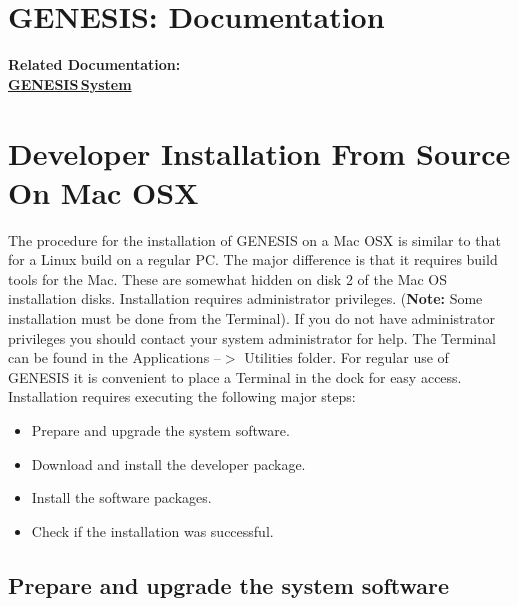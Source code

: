 \documentclass[12pt]{article}
\begin{document}
\section*{GENESIS: Documentation}

{\bf Related Documentation:} \\
\href{../genesis-system/genesis-system.tex}{\bf GENESIS\,System}


\section*{Developer Installation From Source On Mac OSX}

The procedure for the installation of GENESIS on a Mac OSX is similar to that for a Linux build on a regular PC. The major difference is that it requires build tools for the Mac. These are somewhat hidden on disk 2 of the Mac OS installation disks. Installation requires administrator privileges. ({\bf Note:} Some installation must be done from the Terminal). If you do not have administrator privileges you should contact your system administrator for help. The Terminal can be found in the Applications --$>$ Utilities folder. For regular use of GENESIS it is convenient to place a Terminal in the dock for easy access.
Installation requires executing the following major steps:
\begin{itemize}
   \item[] Prepare and upgrade the system software.
   \item[] Download and install the developer package.
   \item[] Install the software packages.
   \item[] Check if the installation was successful. 
\end{itemize}

\subsection*{Prepare and upgrade the system software}
\end{document}
